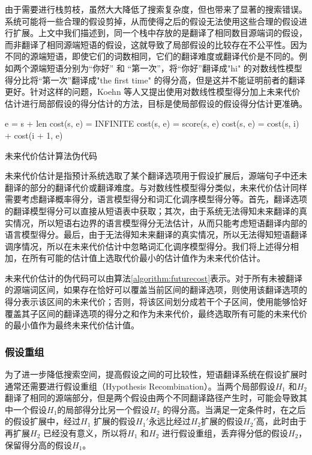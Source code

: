 \documentclass[master, winfont]{njuthesis}
\begin{document}
由于需要进行栈剪枝，虽然大大降低了搜索复杂度，但也带来了显著的搜索错误。系统可能将一些合理的假设剪掉，从而使得之后的假设无法使用这些合理的假设进行扩展。上文中我们描述到，同一个栈中存放的是翻译了相同数目源端词的假设，而非翻译了相同源端短语的假设，这就导致了局部假设的比较存在不公平性。因为不同的源端短语，即使它们的词数相同，它们的翻译难度或翻译代价是不同的。例如两个源端短语分别为“你好” 和 “第一次”，将“你好”翻译成"hi" 的对数线性模型得分比将“第一次”翻译成"the first time" 的得分高，但是这并不能证明前者的翻译更好。针对这样的问题，Koehn 等人又提出使用对数线性模型得分加上未来代价估计进行局部假设的得分估计的方法，目标是使局部假设的假设得分估计更准确。

\begin{algorithm}
\begin{algorithmic}[1]
        \STATE e = s + len
        \STATE cost(s, e) = INFINITE
            \STATE cost(s, e) = score(s, e)
        \ENDIF
                \STATE cost(s, e) = cost(s, i) + cost(i + 1, e)
            \ENDIF
        \ENDFOR
    \ENDFOR
\ENDFOR
\end{algorithmic}
\caption{\label{algorithm:futurecost}未来代价估计算法伪代码}
\end{algorithm}

未来代价估计是指预计系统选取了某个翻译选项用于假设扩展后，源端句子中还未翻译的部分的翻译代价或翻译难度。与对数线性模型得分类似，未来代价估计同样需要考虑翻译概率得分，语言模型得分和词汇化调序模型得分等。首先，翻译选项的翻译模型得分可以直接从短语表中获取；其次，由于系统无法得知未来翻译的真实情况，所以短语右边界的语言模型得分无法估计，从而只能考虑短语翻译内部的语言模型得分。最后，由于无法得知未来翻译的真实情况，所以无法得知短语翻译调序情况，所以在未来代价估计中忽略词汇化调序模型得分。我们将上述得分相加，在所有可能的估计值上选取代价最小的估计值作为未来代价估计。

未来代价估计的伪代码可以由算法\ref{algorithm:futurecost}表示。对于所有未被翻译的源端词区间，如果存在恰好可以覆盖当前区间的翻译选项，则使用该翻译选项的得分表示该区间的未来代价；否则，将该区间划分成若干个子区间，使用能够恰好覆盖其子区间的翻译选项的得分之和作为未来代价，最终选取所有可能的未来代价的最小值作为最终未来代价估计值。

\subsubsection{假设重组}
为了进一步降低搜索空间，提高假设之间的可比较性，短语翻译系统在假设扩展时通常还需要进行假设重组（Hypothesis Recombination）。当两个局部假设$H_1$ 和$H_2$ 翻译了相同的源端部分，但是两个假设由两个不同翻译路径产生时，可能会导致其中一个假设$H_1$的局部得分比另一个假设$H_2$ 的得分高。当满足一定条件时，在之后的假设扩展中，经过$H_1$ 扩展的假设$H_1'$永远比经过$H_2$扩展的假设$H_2'$高，此时由于再扩展$H_2$ 已经没有意义，所以将$H_1$ 和$H_2$ 进行假设重组，丢弃得分低的假设$H_2$，保留得分高的假设$H_1$。
\end{document}
